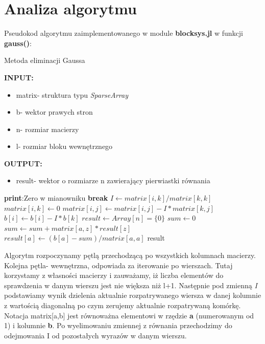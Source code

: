 \documentclass[a4paper,14pt]{report}
\begin{document}
  \section{Analiza algorytmu}
  Pseudokod algorytmu zaimplementowanego w module \textbf{blocksys.jl} w funkcji \textbf{gauss()}:

  \begin{algorithm}[H]
    \caption{Metoda eliminacji Gaussa}
    \textbf{INPUT:}
    \begin{itemize}
      \item matrix- struktura typu \textit{SparseArray}
      \item b- wektor prawych stron 
      \item n- rozmiar macierzy
      \item l- rozmiar bloku wewnętrznego
    \end{itemize}
    \textbf{OUTPUT:}
    \begin{itemize}
      \item result- wektor o rozmiarze n zawierający pierwiastki równania
    \end{itemize}
    \begin{algorithmic} 
            \STATE \textbf{print}:Zero w mianowniku
            \STATE \textbf{break}
          \ENDIF
          \STATE $I \leftarrow matrix[i,k]/matrix[k,k]$
          \STATE $matrix[i,k] \leftarrow 0$
            \STATE $matrix[i,j] \leftarrow matrix[i,j]-I*matrix[k,j]$
          \ENDFOR
          \STATE $b[i] \leftarrow b[i]-I*b[k]$
        \ENDFOR
        \STATE $result \leftarrow Array[n]=\{0\}$
          \STATE $sum \leftarrow 0$
            \STATE $sum \leftarrow sum+matrix[a,z]*result[z]$
          \ENDFOR
          \STATE $result[a] \leftarrow (b[a]-sum)/matrix[a,a]$
        \ENDFOR
      \ENDFOR
      \RETURN result
      \end{algorithmic}
  \end{algorithm}
  Algorytm rozpoczynamy pętlą przechodzącą po wszystkich kolumnach macierzy. Kolejna pętla- wewnętrzna, odpowiada za iterowanie po wierszach. Tutaj korzystamy z własności macierzy i zauważamy, iż liczba elementów do sprawdzenia w danym wierszu jest nie większa niż l+1. Następnie pod zmienną \textit{I} podstawiamy wynik dzielenia aktualnie rozpatrywanego wiersza w danej kolumnie z wartością diagonalną po czym zerujemy aktualnie rozpatrywaną komórkę. Notacja matrix[a,b] jest równoważna elementowi w rzędzie \textbf{a} (numerowanym od 1) i kolumnie \textbf{b}. Po wyelimowaniu zmiennej z równania przechodzimy do odejmowania I od pozostałych wyrazów w danym wierszu. \\
\end{document}

